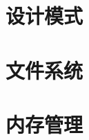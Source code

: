 \documentclass[
    UTF8,       %
    b5paper,    %
    10pt,       %
    oneside,    %
    openright,  %
    titlepage,  %
    final       %
]{ctexbook}
\begin{document}

    \maketitle
    \chapter{设计模式}



    \maketitle
    \chapter{文件系统}
    

    \maketitle
    \chapter{内存管理}

    \maketitle
\end{document}

